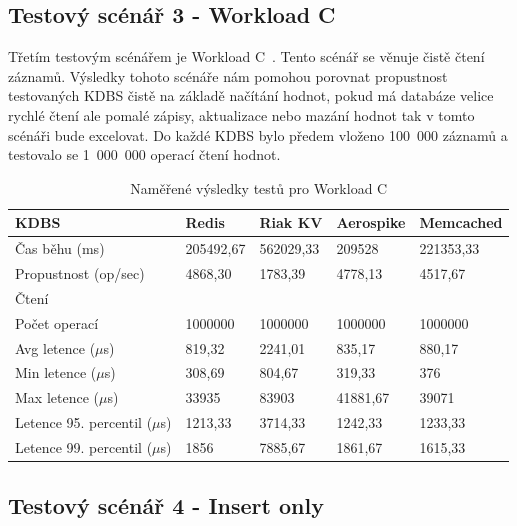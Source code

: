 \documentclass[czech,master,dept460,male,csharp,cpdeclaration]{diploma}
\begin{document}
	\subsection{Testový scénář 3 - Workload C}
	
	Třetím testovým scénářem je Workload C~\cite{workloads}. Tento scénář se věnuje čistě čtení záznamů. Výsledky tohoto scénáře nám pomohou porovnat propustnost testovaných KDBS čistě na základě načítání hodnot, pokud má databáze velice rychlé čtení ale pomalé zápisy, aktualizace nebo mazání hodnot tak v tomto scénáři bude excelovat. Do každé KDBS bylo předem vloženo 100~000 záznamů a testovalo se 1~000~000 operací čtení hodnot.
	
	\begin{table}
		\centering
		\begin{tabular}{ l | l l l l }
			\toprule
			KDBS & Redis & Riak KV & Aerospike & Memcached \\
			\midrule
			Čas běhu (ms) & 205492,67 & 562029,33 & 209528 & 221353,33 \\
			Propustnost (op/sec) & 4868,30 & 1783,39 & 4778,13 & 4517,67 \\
			\midrule
			\multicolumn{5}{l}{Čtení} \\
			Počet operací & 1000000 & 1000000 & 1000000 & 1000000 \\
			Avg letence ($\mu$s) & 819,32 & 2241,01 & 835,17 & 880,17 \\
			Min letence ($\mu$s) & 308,69 & 804,67 & 319,33 & 376 \\
			Max letence ($\mu$s) & 33935 & 83903 & 41881,67 & 39071 \\
			Letence 95. percentil ($\mu$s) & 1213,33 & 3714,33 & 1242,33 & 1233,33 \\
			Letence 99. percentil ($\mu$s) & 1856 & 7885,67 & 1861,67 & 1615,33 \\
			\bottomrule
		\end{tabular}
		\caption{Naměřené výsledky testů pro Workload C\label{tab_workload_c}}
	\end{table}
	
	\subsection{Testový scénář 4 - Insert only} 
	
\end{document}
